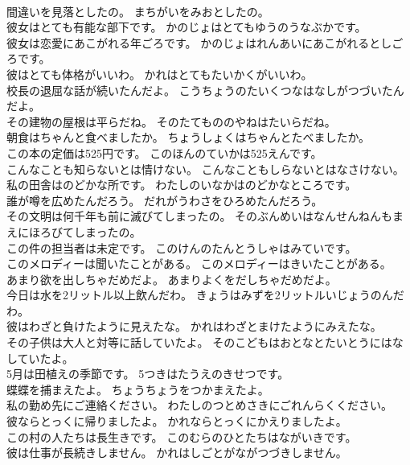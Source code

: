 \documentclass[8pt]{extreport}
\begin{document}
\begin{CJK}{UTF8}{min}
\\	間違いを見落としたの。	まちがいをみおとしたの。 
\\	彼女はとても有能な部下です。	かのじょはとてもゆうのうなぶかです。 
\\	彼女は恋愛にあこがれる年ごろです。	かのじょはれんあいにあこがれるとしごろです。 
\\	彼はとても体格がいいわ。	かれはとてもたいかくがいいわ。 
\\	校長の退屈な話が続いたんだよ。	こうちょうのたいくつなはなしがつづいたんだよ。 
\\	その建物の屋根は平らだね。	そのたてもののやねはたいらだね。 
\\	朝食はちゃんと食べましたか。	ちょうしょくはちゃんとたべましたか。 
\\	この本の定価は525円です。	このほんのていかは525えんです。 
\\	こんなことも知らないとは情けない。	こんなこともしらないとはなさけない。 
\\	私の田舎はのどかな所です。	わたしのいなかはのどかなところです。 
\\	誰が噂を広めたんだろう。	だれがうわさをひろめたんだろう。 
\\	その文明は何千年も前に滅びてしまったの。	そのぶんめいはなんせんねんもまえにほろびてしまったの。 
\\	この件の担当者は未定です。	このけんのたんとうしゃはみていです。 
\\	このメロディーは聞いたことがある。	このメロディーはきいたことがある。 
\\	あまり欲を出しちゃだめだよ。	あまりよくをだしちゃだめだよ。 
\\	今日は水を2リットル以上飲んだわ。	きょうはみずを2リットルいじょうのんだわ。 
\\	彼はわざと負けたように見えたな。	かれはわざとまけたようにみえたな。 
\\	その子供は大人と対等に話していたよ。	そのこどもはおとなとたいとうにはなしていたよ。 
\\	5月は田植えの季節です。	5つきはたうえのきせつです。 
\\	蝶蝶を捕まえたよ。	ちょうちょうをつかまえたよ。 
\\	私の勤め先にご連絡ください。	わたしのつとめさきにごれんらくください。 
\\	彼ならとっくに帰りましたよ。	かれならとっくにかえりましたよ。 
\\	この村の人たちは長生きです。	このむらのひとたちはながいきです。 
\\	彼は仕事が長続きしません。	かれはしごとがながつづきしません。 

\end{CJK}
\end{document}
